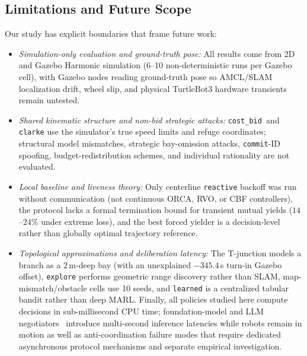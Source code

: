 \documentclass[letterpaper,journal]{IEEEtran}
\newcommand{\cb}{\texttt{cost\_bid}}
\begin{document}
\subsection{Limitations and Future Scope}
Our study has explicit boundaries that frame future work:
\begin{itemize}
\item \emph{Simulation-only evaluation and ground-truth pose:} All results come from 2D and Gazebo Harmonic simulation (6--10 non-deterministic runs per Gazebo cell), with Gazebo nodes reading ground-truth pose so AMCL/SLAM localization drift, wheel slip, and physical TurtleBot3 hardware transients remain untested.
\item \emph{Shared kinematic structure and non-bid strategic attacks:} \cb\ and \texttt{clarke} use the simulator's true speed limits and refuge coordinates; structural model mismatches, strategic bay-omission attacks, \texttt{commit}-ID spoofing, budget-redistribution schemes, and individual rationality are not evaluated.
\item \emph{Local baseline and liveness theory:} Only centerline \texttt{reactive} backoff was run without communication (not continuous ORCA, RVO, or CBF controllers), the protocol lacks a formal termination bound for transient mutual yields ($14$--$24\%$ under extreme loss), and the best forced yielder is a decision-level rather than globally optimal trajectory reference.
\item \emph{Topological approximations and deliberation latency:} The T-junction models a branch as a $2$\,m-deep bay (with an unexplained $-345.4$\,s turn-in Gazebo offset), \texttt{explore} performs geometric range discovery rather than SLAM, map-mismatch/obstacle cells use 10 seeds, and \texttt{learned} is a centralized tabular bandit rather than deep MARL. Finally, all policies studied here compute decisions in sub-millisecond CPU time; foundation-model and LLM negotiators~\cite{marlin2024,gamechat2025,garg2024llm} introduce multi-second inference latencies while robots remain in motion as well as anti-coordination failure modes that require dedicated asynchronous protocol mechanisms and separate empirical investigation.
\end{itemize}
\end{document}
